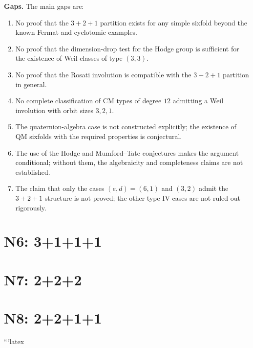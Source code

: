 \documentclass{article}
\begin{document}
\medskip
\noindent\textbf{Gaps.}
The main gaps are:
\begin{enumerate}
\item No proof that the \(3+2+1\) partition exists for any simple sixfold beyond the known Fermat and cyclotomic examples.
\item No proof that the dimension-drop test for the Hodge group is sufficient for the existence of Weil classes of type \((3,3)\).
\item No proof that the Rosati involution is compatible with the \(3+2+1\) partition in general.
\item No complete classification of CM types of degree \(12\) admitting a Weil involution with orbit sizes \(3,2,1\).
\item The quaternion-algebra case is not constructed explicitly; the existence of QM sixfolds with the required properties is conjectural.
\item The use of the Hodge and Mumford--Tate conjectures makes the argument conditional; without them, the algebraicity and completeness claims are not established.
\item The claim that only the cases \((e,d)=(6,1)\) and \((3,2)\) admit the \(3+2+1\) structure is not proved; the other type IV cases are not ruled out rigorously.
\end{enumerate}

\section{N6: 3+1+1+1}

\section{N7: 2+2+2}

\section{N8: 2+2+1+1}
```latex
\end{document}
